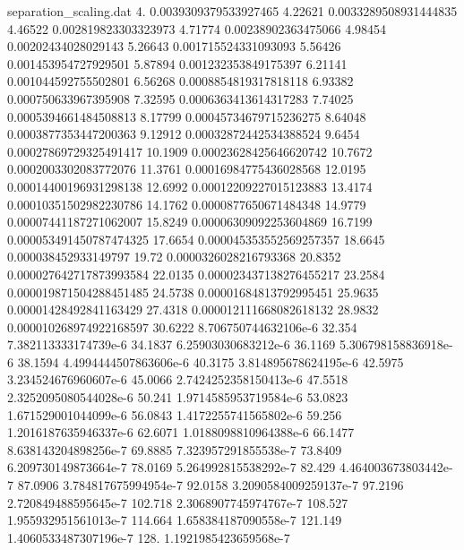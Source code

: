 \begin{filecontents}{separation_scaling.dat}
4.	0.0039309379533927465
4.22621	0.0033289508931444835
4.46522	0.002819823303323973
4.71774	0.00238902363475066
4.98454	0.00202434028029143
5.26643	0.001715524331093093
5.56426	0.001453954727929501
5.87894	0.001232353849175397
6.21141	0.001044592755502801
6.56268	0.0008854819317818118
6.93382	0.000750633967395908
7.32595	0.0006363413614317283
7.74025	0.0005394661484508813
8.17799	0.00045734679715236275
8.64048	0.0003877353447200363
9.12912	0.00032872442534388524
9.6454	0.00027869729325491417
10.1909	0.00023628425646620742
10.7672	0.0002003302083772076
11.3761	0.00016984775436028568
12.0195	0.00014400196931298138
12.6992	0.00012209227015123883
13.4174	0.00010351502982230786
14.1762	0.0000877650671484348
14.9779	0.00007441187271062007
15.8249	0.00006309092253604869
16.7199	0.000053491450787474325
17.6654	0.000045353552569257357
18.6645	0.000038452933149797
19.72	0.0000326028216793368
20.8352	0.000027642717873993584
22.0135	0.000023437138276455217
23.2584	0.000019871504288451485
24.5738	0.00001684813792995451
25.9635	0.00001428492841163429
27.4318	0.000012111668082618132
28.9832	0.000010268974922168597
30.6222	8.706750744632106e-6
32.354	7.382113333174739e-6
34.1837	6.25903030683212e-6
36.1169	5.306798158836918e-6
38.1594	4.4994444507863606e-6
40.3175	3.814895678624195e-6
42.5975	3.234524676960607e-6
45.0066	2.7424252358150413e-6
47.5518	2.3252095080544028e-6
50.241	1.9714585953719584e-6
53.0823	1.671529001044099e-6
56.0843	1.4172255741565802e-6
59.256	1.2016187635946337e-6
62.6071	1.0188098810964388e-6
66.1477	8.638143204898256e-7
69.8885	7.323957291855538e-7
73.8409	6.209730149873664e-7
78.0169	5.264992815538292e-7
82.429	4.464003673803442e-7
87.0906	3.784817675994954e-7
92.0158	3.2090584009259137e-7
97.2196	2.720849488595645e-7
102.718	2.3068907745974767e-7
108.527	1.955932951561013e-7
114.664	1.658384187090558e-7
121.149	1.4060533487307196e-7
128.	1.1921985423659568e-7
\end{filecontents}

